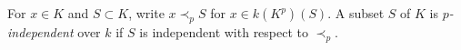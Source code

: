 For $x \in K$ and $S \subset K$, write $x \prec_p S$ for $x \in k(K^p)(S)$. A subset $S$ of $K$ is \textit{$p$-independent} over $k$ if $S$ is independent with respect to $\prec_p$.
